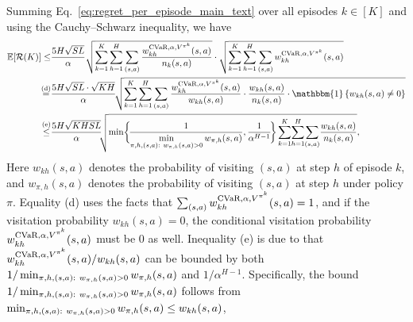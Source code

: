 \documentclass{article} %
\newcommand{\cR}{\mathcal{R}}
\newcommand{\ex}{\mathbb{E}}
\newcommand{\sbr}[1]{\left( #1 \right)}
\newcommand{\cvar}{\textup{CVaR}}
\newcommand{\indicator}[1]{\mathbbm{1}\left\{ #1 \right\}}
\newcommand{\revision}[1]{{\color{black} #1}}
\newcommand{\longbo}[1]{}
\newcommand{\yihan}[1]{}
\newcommand{\longbo}[1]{{\color{red}  [\text{Longbo:} #1]}}
\newcommand{\yihan}[1]{{\color{teal} [\text{Yihan:} #1]}}
\begin{document}
	
	Summing Eq.~\eqref{eq:regret_per_episode_main_text} over all episodes $k \in [K]$ and using the Cauchy–Schwarz inequality, we have
	\begin{align*}
		\ex[\cR(K)]
		\leq & \frac{5H\sqrt{SL}}{\alpha} \sqrt{ \sum_{k=1}^{K} \sum_{h=1}^{H} \sum_{(s,a)} \frac{w^{\cvar,\alpha,V^{\pi^k}}_{kh}(s,a)}{n_k(s,a)}} \cdot \sqrt{\sum_{k=1}^{K} \sum_{h=1}^{H} \sum_{(s,a)} w^{\cvar,\alpha,V^{\pi^k}}_{kh}(s,a)}
		\nonumber\\
		\overset{\textup{(d)}}{=} & \frac{ 5H\sqrt{SL} \cdot \sqrt{KH} }{\alpha} \! \sqrt{ \sum_{k=1}^{K} \sum_{h=1}^{H} \sum_{(s,a)} \frac{w^{\cvar,\alpha,V^{\pi^k}}_{kh}(s,a)}{w_{kh}(s,a)} \cdot \frac{w_{kh}(s,a)}{n_k(s,a)} \cdot \indicator{w_{kh}(s,a) \neq 0} } 
		\nonumber\\
		\overset{\textup{(e)}}{\leq} & \frac{5H\sqrt{KHSL}}{\alpha} \!\! \sqrt{ \min \! \bigg\{\! \frac{1}{ \min \limits_{\begin{subarray}{c}\pi,h,(s,a):\ w_{\pi,h}(s,a)>0\end{subarray}} w_{\pi,h}(s,a)}, \frac{1}{\alpha^{H-1}} \!\bigg\}  \sum_{k=1}^{K} \! \sum_{h=1}^{H} \! \sum_{(s,a)} \! \frac{w_{kh}(s,a)}{n_k(s,a)} } ,
	\end{align*}
	Here $w_{kh}(s,a)$ denotes the probability of visiting $(s,a)$ at step $h$ of episode $k$, and \revision{$w_{\pi,h}(s,a)$ denotes the probability of visiting $(s,a)$ at step $h$ under policy $\pi$.} Equality (d) uses the facts that  $\sum_{(s,a)} w^{\cvar,\alpha,V^{\pi^k}}_{kh}(s,a) = 1$, and if the visitation probability $w_{kh}(s,a)=0$, the conditional visitation probability $w^{\cvar,\alpha,V^{\pi^k}}_{kh}(s,a)$ must be 0 as well. Inequality (e) is due to that $w^{\cvar,\alpha,V^{\pi^k}}_{kh}(s,a)/w_{kh}(s,a)$ can be bounded by both $1/ \min_{\begin{subarray}{c}\pi,h,(s,a):\ w_{\pi,h}(s,a)>0\end{subarray}} w_{\pi,h}(s,a)$ and $1/\alpha^{H-1}$. 
	Specifically, the bound $1/ \min_{\begin{subarray}{c}\pi,h,(s,a):\ w_{\pi,h}(s,a)>0\end{subarray}} w_{\pi,h}(s,a)$ follows from $\min_{\begin{subarray}{c}\pi,h,(s,a):\ w_{\pi,h}(s,a)>0\end{subarray}} w_{\pi,h}(s,a) \leq w_{kh}(s,a)$, %
\end{document}
